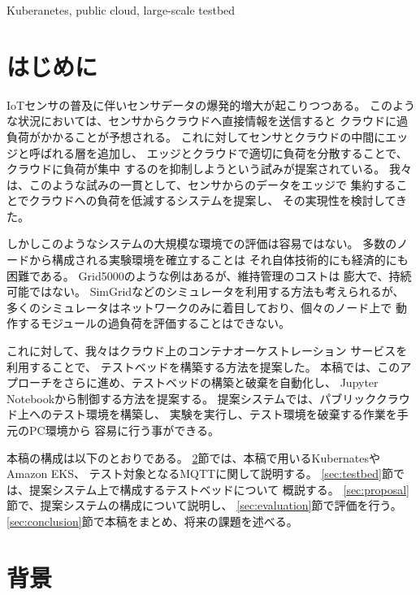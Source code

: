 \documentclass[submit,techrep]{ipsj}
\newcommand{\kbs}{Kubernates}
\begin{document}
\begin{ekeyword}
  Kuberanetes, public cloud, large-scale testbed
\end{ekeyword}

\maketitle

\section{はじめに}

IoTセンサの普及に伴いセンサデータの爆発的増大が起こりつつある。
このような状況においては、センサからクラウドへ直接情報を送信すると
クラウドに過負荷がかかることが予想される。
これに対してセンサとクラウドの中間にエッジと呼ばれる層を追加し、
エッジとクラウドで適切に負荷を分散することで、クラウドに負荷が集中
するのを抑制しようという試みが提案されている。
我々は、このような試みの一貫として、センサからのデータをエッジで
集約することでクラウドへの負荷を低減するシステムを提案し、
その実現性を検討してきた\cite{tou-os}。

しかしこのようなシステムの大規模な環境での評価は容易ではない。
多数のノードから構成される実験環境を確立することは
それ自体技術的にも経済的にも困難である。
Grid5000\cite{grid5000}のような例はあるが、維持管理のコストは
膨大で、持続可能ではない。
%
SimGrid\cite{simgrid}などのシミュレータを利用する方法も考えられるが、
多くのシミュレータはネットワークのみに着目しており、個々のノード上で
動作するモジュールの過負荷を評価することはできない。

これに対して、我々はクラウド上のコンテナオーケストレーション
サービスを利用することで、
テストベッドを構築する方法を提案した\cite{tou-hpc}。
本稿では、このアプローチをさらに進め、テストベッドの構築と破棄を自動化し、
Jupyter Notebookから制御する方法を提案する。
提案システムでは、パブリッククラウド上へのテスト環境を構築し、
実験を実行し、テスト環境を破棄する作業を手元のPC環境から
容易に行う事ができる。

本稿の構成は以下のとおりである。
\ref{sec:background}節では、本稿で用いる\kbs やAmazon EKS、
テスト対象となるMQTTに関して説明する。
\ref{sec:testbed}節では、提案システム上で構成するテストベッドについて
概説する。
\ref{sec:proposal}節で、提案システムの構成について説明し、
\ref{sec:evaluation}節で評価を行う。
\ref{sec:conclusion}節で本稿をまとめ、将来の課題を述べる。

\section{背景}\label{sec:background}
\end{document}
